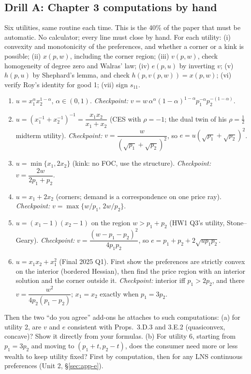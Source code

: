 \documentclass[11pt]{article}
\begin{document}
\subsection{Drill A: Chapter 3 computations by hand}
\begin{todo}{Six utilities, same routine each time. This is the 40\% of the paper that must be automatic. No calculator; every line must close by hand.}
For each utility: (i) convexity and monotonicity of the preferences, and whether a corner or a kink is possible; (ii) $x(p,w)$, including the corner region; (iii) $v(p,w)$, check homogeneity of degree zero and Walras' law; (iv) $e(p,u)$ by inverting $v$; (v) $h(p,u)$ by Shephard's lemma, and check $h(p,v(p,w))=x(p,w)$; (vi) verify Roy's identity for good 1; (vii) sign $s_{11}$.
\begin{enumerate}
\item $u=x_1^{\alpha}x_2^{1-\alpha}$, $\alpha\in(0,1)$. \emph{Checkpoint:} $v=w\,\alpha^\alpha(1-\alpha)^{1-\alpha}p_1^{-\alpha}p_2^{-(1-\alpha)}$.
\item $u=(x_1^{-1}+x_2^{-1})^{-1}=\dfrac{x_1x_2}{x_1+x_2}$ (CES with $\rho=-1$; the dual twin of his $\rho=\tfrac12$ midterm utility). \emph{Checkpoint:} $v=\dfrac{w}{(\sqrt{p_1}+\sqrt{p_2})^2}$, so $e=u(\sqrt{p_1}+\sqrt{p_2})^2$.
\item $u=\min\{x_1,2x_2\}$ (kink: no FOC, use the structure). \emph{Checkpoint:} $v=\dfrac{2w}{2p_1+p_2}$.
\item $u=x_1+2x_2$ (corners; demand is a correspondence on one price ray). \emph{Checkpoint:} $v=\max\{w/p_1,\,2w/p_2\}$.
\item $u=(x_1-1)(x_2-1)$ on the region $w>p_1+p_2$ (HW1 Q3's utility, Stone--Geary). \emph{Checkpoint:} $v=\dfrac{(w-p_1-p_2)^2}{4p_1p_2}$, so $e=p_1+p_2+2\sqrt{up_1p_2}$.
\item $u=x_1x_2+x_1^2$ (Final 2025 Q1). First show the preferences are strictly convex on the interior (bordered Hessian), then find the price region with an interior solution and the corner outside it. \emph{Checkpoint:} interior iff $p_1>2p_2$, and there $v=\dfrac{w^2}{4p_2(p_1-p_2)}$; $x_1=x_2$ exactly when $p_1=3p_2$.
\end{enumerate}
Then the two ``do you agree'' add-ons he attaches to such computations: (a) for utility 2, are $v$ and $e$ consistent with Props.~3.D.3 and 3.E.2 (quasiconvex, concave)? Show it directly from your formulas. (b) For utility 6, starting from $p_1=3p_2$ and moving to $(p_1+t,p_2-t)$, does the consumer need more or less wealth to keep utility fixed? First by computation, then for any LNS continuous preferences (Unit 2, \S\ref{sec:app-e}).
\end{todo}
\end{document}
